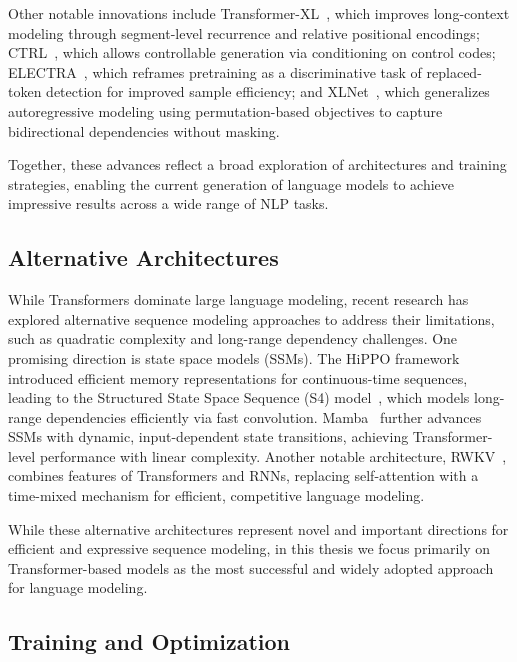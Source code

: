 Other notable innovations include Transformer-XL~\citep{dai2019transformer}, which improves long-context modeling through segment-level recurrence and relative positional encodings; CTRL~\citep{keskar2019ctrl}, which allows controllable generation via conditioning on control codes; ELECTRA~\citep{clark2020electra}, which reframes pretraining as a discriminative task of replaced-token detection for improved sample efficiency; and XLNet~\citep{yang2019xlnet}, which generalizes autoregressive modeling using permutation-based objectives to capture bidirectional dependencies without masking.

Together, these advances reflect a broad exploration of architectures and training strategies, enabling the current generation of language models to achieve impressive results across a wide range of NLP tasks.

\subsection{Alternative Architectures}
While Transformers dominate large language modeling, recent research has explored alternative sequence modeling approaches to address their limitations, such as quadratic complexity and long-range dependency challenges. One promising direction is state space models (SSMs). The HiPPO framework~\citep{gu2020hippo} introduced efficient memory representations for continuous-time sequences, leading to the Structured State Space Sequence (S4) model~\citep{gu2021efficiently}, which models long-range dependencies efficiently via fast convolution. Mamba~\citep{gu2023mamba} further advances SSMs with dynamic, input-dependent state transitions, achieving Transformer-level performance with linear complexity. Another notable architecture, RWKV~\citep{peng2023rwkv}, combines features of Transformers and RNNs, replacing self-attention with a time-mixed mechanism for efficient, competitive language modeling. 

While these alternative architectures represent novel and important directions for efficient and expressive sequence modeling, in this thesis we focus primarily on Transformer-based models as the most successful and widely adopted approach for language modeling.

\subsection{Training and Optimization}

